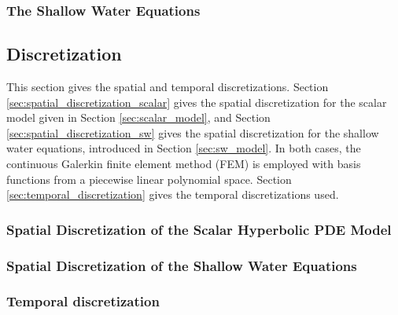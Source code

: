 \documentclass[12pt]{article}
\newcommand{\contentdir}{../dissertation/content}
\begin{document}
\subsubsection{The Shallow Water Equations\label{sec:sw_model}}


\subsection{Discretization}
This section gives the spatial and temporal discretizations. Section
\ref{sec:spatial_discretization_scalar} gives the spatial discretization
for the scalar model given in Section \ref{sec:scalar_model}, and
Section \ref{sec:spatial_discretization_sw} gives the spatial discretization
for the shallow water equations, introduced in Section \ref{sec:sw_model}.
In both cases, the continuous Galerkin finite element method (FEM) is employed
with basis functions from a piecewise linear polynomial space.
Section \ref{sec:temporal_discretization} gives the temporal discretizations
used.

\subsubsection{Spatial Discretization of the Scalar Hyperbolic PDE Model
\label{sec:spatial_discretization_scalar}}


\subsubsection{Spatial Discretization of the Shallow Water Equations
\label{sec:spatial_discretization_sw}}


\subsubsection{Temporal discretization
\label{sec:temporal_discretization}}

\end{document}
